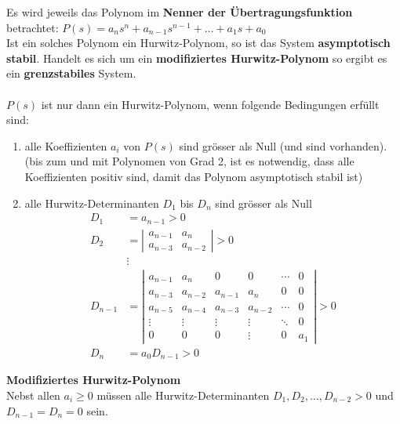 			Es wird jeweils das Polynom im \textbf{Nenner der Übertragungsfunktion} betrachtet:
$P(s) = a_n s^n + a_{n-1} s^{n-1} +\ldots +a_1s + a_0$ \\
Ist ein solches Polynom ein Hurwitz-Polynom, so ist das System \textbf{asymptotisch stabil}.
Handelt es sich um ein \textbf{modifiziertes Hurwitz-Polynom} so ergibt es ein
\textbf{grenzstabiles} System.\\ \\
$P(s)$ ist nur dann ein Hurwitz-Polynom, wenn folgende Bedingungen erfüllt sind:
\begin{enumerate}
	\item	alle Koeffizienten $a_i$ von $P(s)$ sind grösser als Null (und sind vorhanden).\\
				(bis zum und mit Polynomen von Grad 2, ist es notwendig, dass alle Koeffizienten positiv
				sind, damit das Polynom asymptotisch stabil ist)
	\item	alle Hurwitz-Determinanten $D_1$ bis $D_n$ sind grösser als Null\\
				\begin{align}
					D_1 &= a_{n-1} > 0 \nonumber\\
					D_2 &= \left|
						\begin{matrix}
							a_{n-1} & a_n\\
							a_{n-3} & a_{n-2}
						\end{matrix}\right| > 0 \nonumber \\
						&\vdots \nonumber \\
					D_{n-1} &= \left|
						\begin{matrix}
							a_{n-1} & a_n & 0 & 0 & \cdots & 0 \\
							a_{n-3} & a_{n-2} & a_{n-1} & a_n & 0 & 0 \\
							a_{n-5} & a_{n-4} & a_{n-3} & a_{n-2} & \cdots & 0 \\
							\vdots & \vdots & \vdots & \vdots & \ddots & 0 \\
							0 & 0 & 0 & \vdots & 0 & a_1
						\end{matrix}\right| > 0 \nonumber \\
					D_n &= a_0D_{n-1} > 0 \nonumber
				\end{align}
\end{enumerate}

\textbf{Modifiziertes Hurwitz-Polynom}\\
Nebst allen $a_i \geq 0$ müssen alle Hurwitz-Determinanten $D_1, D_2, \ldots, D_{n-2} > 0$
und $D_{n-1} = D_n = 0$ sein. \\ \\

